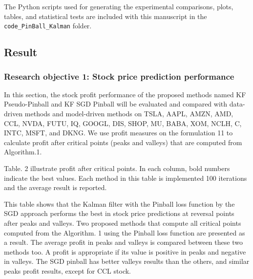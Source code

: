 \documentclass[12pt,a4paper]{article}
\begin{document}
	The Python scripts used for generating the experimental comparisons, plots, tables, and statistical tests are included with this manuscript in the \texttt{code\_PinBall\_Kalman} folder.
	
	\subsection{Result}
	
	\subsubsection{Research objective 1: Stock price prediction performance}
	
	In this section, the stock profit performance of the proposed methods named KF Pseudo-Pinball and KF SGD Pinball will be evaluated and compared with data-driven methods and model-driven methods on TSLA, AAPL, AMZN, AMD, CCL, NVDA, FUTU, IQ, GOOGL, DIS, SHOP, MU, BABA, XOM, NCLH, C, INTC, MSFT, and DKNG. We use profit measures on the formulation 11 to calculate profit after critical points (peaks and valleys) that are computed from Algorithm.1.
	
	Table. 2 illustrate profit after critical points. In each column, bold numbers indicate the best values. Each method in this table is implemented 100 iterations and the average result is reported.
	
	This table shows that the Kalman filter with the Pinball loss function by the SGD approach performs the best in stock price predictions at reversal points after peaks and valleys. Two proposed methods that compute all critical points computed from the Algorithm. 1 using the Pinball loss function are presented as a result. The average profit in peaks and valleys is compared between these two methods too. A profit is appropriate if its value is positive in peaks and negative in valleys. The SGD pinball has better valleys results than the others, and similar peaks profit results, except for CCL stock.
	
	\begin{table}[H]
		\centering
		\caption{The profits of Peaks and valleys of GOOG, AAPL, MSFT, TSLA, AMD, AMZN, BABA, C, CCL, DIS, FUTU, GOOGL, IQ, LTC, MU, NCLH, XOM, SHOP, NVDA, and INTC stocks.}
	\end{table}
	
\end{document}

